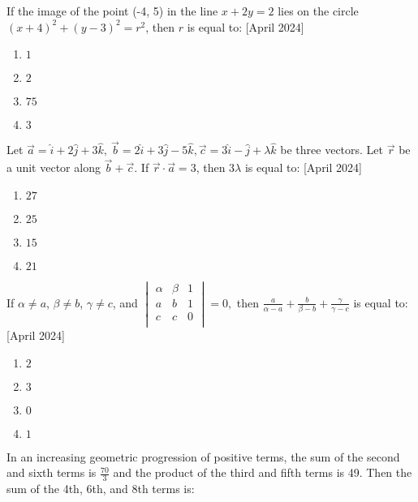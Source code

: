 \iffalse
\title{April 2024}
\author{AI24BTECH11012}
\section{mcq-single}
\fi
    \item If the image of the point (-4, 5) in the line $x + 2y = 2$ lies on the circle $(x + 4)^2 + (y - 3)^2 = r^2$, then $r$ is equal to:
    \hfill{[April 2024]}
    \begin{enumerate}
        \item $1$
        \item $2$
        \item $75$
        \item $3$
    \end{enumerate}
    
    \item Let $\overrightarrow{a} = \hat{i} + 2\hat{j} + 3\hat{k}, \ \overrightarrow{b} = 2\hat{i} + 3\hat{j} - 5\hat{k}, \overrightarrow{c} = 3\hat{i} - \hat{j} + \lambda\hat{k}$ be three vectors. Let $\overrightarrow{r}$ be a unit vector along $\overrightarrow{b} + \overrightarrow{c}$. If $\overrightarrow{r} \cdot \overrightarrow{a} = 3$, then $3\lambda$ is equal to:
    \hfill{[April 2024]}
    \begin{enumerate}
        \item $27$
        \item $25$
        \item $15$
        \item $21$
    \end{enumerate}
    \item If $\alpha \neq a$, $\beta \neq b$, $\gamma \neq c$, and
$
\begin{vmatrix}
\alpha & \beta & 1 \\
a & b & 1 \\
c & c & 0 \\
\end{vmatrix} = 0,
$
then $\frac{a}{\alpha-a}+\frac{b}{\beta-b}+\frac{\gamma}{\gamma-c}$ is equal to:
\hfill{[April 2024]}
    \begin{enumerate}
        \item $2$
        \item $3$
        \item $0$
        \item $1$
    \end{enumerate}
    \item In an increasing geometric progression of positive terms, the sum of the second and sixth terms is $\frac{70}{3}$ and the product of the third and fifth terms is 49. Then the sum of the 4th, 6th, and 8th terms is:
